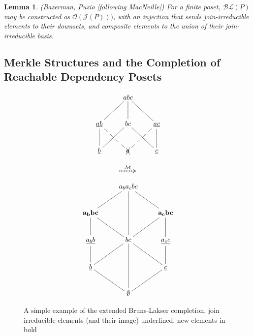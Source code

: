 \documentclass[hoptionsi,review,format=acmsmall]{acmart}
\newtheorem{lemma}[theorem]{Lemma}
\theoremstyle{definition}
\newcommand{\Mcc}{\mathcal{M}}
\newcommand{\Oc}{\mathcal{O}}
\newcommand{\Jc}{\mathcal{J}}
\newcommand{\BLc}{\mathcal{BL}}
\begin{document}
\begin{lemma}
(Bazerman, Puzio [following MacNeille]) For a finite poset, \(\BLc(P)\) may be constructed as \(\Oc(\Jc(P)))\), with an injection that sends join-irreducible elements to their downsets, and composite elements to the union of their join-irreducible basis.
\end{lemma}

\subsection{Merkle Structures and the Completion of Reachable Dependency Posets}


\begin{figure}
\begin{minipage}[c]{0.3\textwidth}
\begin{equation*}
    \xymatrix{& abc \ar@{-}[dl] \ar@{-}[d] \ar@{-}[dr] & \\
      \underline{ab} \ar@{-}[d] \ar@{--}[dr] & bc \ar@{-}[dl] \ar@{-}[dr] &
        \underline{ac} \ar@{-}[d] \ar@{--}[dl] \\
        \underline{b} & \xcancel{a}  & \underline{c} }         
\end{equation*}
\end{minipage}
\begin{minipage}[c]{0.08\textwidth}
  \begin{equation*}
    \xymatrix{\ar@2{~>}[r]^{\Mcc} &}
  \end{equation*}
\end{minipage}
\begin{minipage}[c]{0.3\textwidth}
\begin{equation*}
    \xymatrix{& a_ba_cbc \ar@{-}[dl] \ar@{-}[dd] \ar@{-}[dr] & \\
      \mathbf{a_bbc} \ar@{-}[d] \ar@{-}[dr] & &
        \mathbf{a_cbc} \ar@{-}[d] \ar@{-}[dl]\\
        \underline{a_bb} \ar@{-}[d] & bc \ar@{-}[dl] \ar@{-}[dd] \ar@{-}[dr] &
          \underline{a_cc} \ar@{-}[d] \\
         \underline{b} \ar@{-}[dr] & & \underline{c} \ar@{-}[dl] \\
      & \mathbf{\emptyset} }
\end{equation*}
\end{minipage}
\caption{A simple example of the extended Bruns-Lakser completion, join irreducible elements (and their image) underlined, new elements in bold}
\label{Fig1}
\end{figure}
\end{document}
